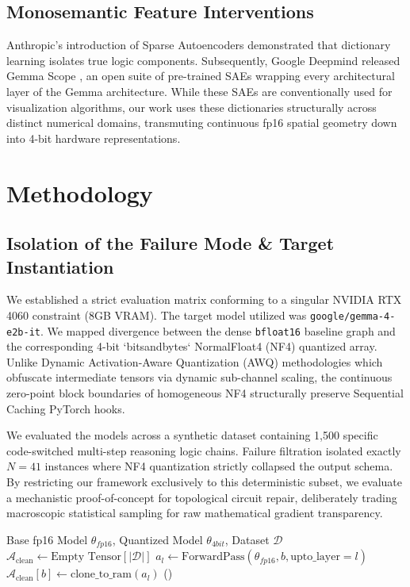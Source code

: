 \documentclass{article}
\begin{document}
\subsection{Monosemantic Feature Interventions}
Anthropic's introduction of Sparse Autoencoders \cite{bricken2023towards} demonstrated that dictionary learning isolates true logic components. Subsequently, Google Deepmind released Gemma Scope \cite{lieberum2024gemmascope}, an open suite of pre-trained SAEs wrapping every architectural layer of the Gemma architecture. While these SAEs are conventionally used for visualization algorithms, our work uses these dictionaries structurally across distinct numerical domains, transmuting continuous fp16 spatial geometry down into 4-bit hardware representations.

\section{Methodology}

\subsection{Isolation of the Failure Mode \& Target Instantiation}
We established a strict evaluation matrix conforming to a singular NVIDIA RTX 4060 constraint (8GB VRAM). The target model utilized was \texttt{google/gemma-4-e2b-it}. We mapped divergence between the dense \texttt{bfloat16} baseline graph and the corresponding 4-bit `bitsandbytes` NormalFloat4 (NF4) quantized array. Unlike Dynamic Activation-Aware Quantization (AWQ) \cite{lin2023awq} methodologies which obfuscate intermediate tensors via dynamic sub-channel scaling, the continuous zero-point block boundaries of homogeneous NF4 structurally preserve Sequential Caching PyTorch hooks.

We evaluated the models across a synthetic dataset containing 1,500 specific code-switched multi-step reasoning logic chains. Failure filtration isolated exactly $N=41$ instances where NF4 quantization strictly collapsed the output schema. By restricting our framework exclusively to this deterministic subset, we evaluate a mechanistic proof-of-concept for topological circuit repair, deliberately trading macroscopic statistical sampling for raw mathematical gradient transparency.

\begin{algorithm}[h]
\caption{Sequential Activation Caching for Attribution Patching (Memory Constrained)}
\label{alg:caching}
\begin{algorithmic}[1]
\Require Base fp16 Model $\theta_{fp16}$, Quantized Model $\theta_{4bit}$, Dataset $\mathcal{D}$
    \State $\mathcal{A}_{\text{clean}} \gets \text{Empty Tensor}[|\mathcal{D}|]$
        \State $a_l \gets \text{ForwardPass}(\theta_{fp16}, b, \text{upto\_layer}=l)$
        \State $\mathcal{A}_{\text{clean}}[b] \gets \text{clone\_to\_ram}(a_l)$
    \EndFor
    \State {}()
\EndFor
\end{algorithmic}
\end{algorithm}
\end{document}
